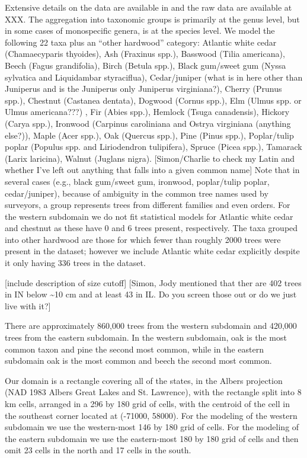 \documentclass[12pt]{article}\usepackage[]{graphicx}\usepackage[]{color}
\begin{document}
Extensive details on the data are available in \cite{Gori:etal:2015}
and the raw data are available at XXX. The aggregation into taxonomic
groups is primarily at the genus level, but in some cases of monospecific
genera, is at the species level. We model the following 22 taxa plus
an ``other hardwood'' category: Atlantic white cedar (Chamaecyparis
thyoides), Ash (Fraxinus spp.), Basswood (Tilia americana), Beech
(Fagus grandifolia), Birch (Betula spp.), Black gum/sweet gum (Nyssa
sylvatica and Liquidambar styraciflua), Cedar/juniper (what is in
here other than Juniperus and is the Juniperus only Juniperus virginiana?),
Cherry (Prunus spp.), Chestnut (Castanea dentata), Dogwood (Cornus
spp.), Elm (Ulmus spp. or Ulmus americana???) , Fir (Abies spp.),
Hemlock (Tsuga canadensis), Hickory (Carya spp.), Ironwood (Carpinus
caroliniana and Ostrya virginiana (anything else?)), Maple (Acer spp.),
Oak (Quercus spp.), Pine (Pinus spp.), Poplar/tulip poplar (Populus
spp. and Liriodendron tulipifera), Spruce (Picea spp.), Tamarack (Larix
laricina), Walnut (Juglans nigra). {[}Simon/Charlie to check my Latin
and whether I've left out anything that falls into a given common
name{]} Note that in several cases (e.g., black gum/sweet gum, ironwood,
poplar/tulip poplar, cedar/juniper), because of ambiguity in the common
tree names used by surveyors, a group represents trees from different
families and even orders. For the western subdomain we do not fit
statistical models for Atlantic white cedar and chestnut as these
have 0 and 6 trees present, respectively. The taxa grouped into other
hardwood are those for which fewer than roughly 2000 trees were present
in the dataset; however we include Atlantic white cedar explicitly
despite it only having 336 trees in the dataset.

{[}include description of size cutoff{]} {[}Simon, Jody mentioned
that ther are 402 trees in IN below \textasciitilde{}10 cm and at
least 43 in IL. Do you screen those out or do we just live with it?{]}

There are approximately 860,000 trees from the western subdomain and
420,000 trees from the eastern subdomain. In the western subdomain,
oak is the most common taxon and pine the second most common, while
in the eastern subdomain oak is the most common and beech the second
most common.

Our domain is a rectangle covering all of the states, in the Albers
projection (NAD 1983 Albers Great Lakes and St. Lawrence), with the
rectangle split into 8 km cells, arranged in a 296 by 180 grid of
cells, with the centroid of the cell in the southeast corner located
at (-71000, 58000). For the modeling of the western subdomain we use
the western-most 146 by 180 grid of cells. For the modeling of the
eastern subdomain we use the eastern-most 180 by 180 grid of cells
and then omit 23 cells in the north and 17 cells in the south.
\end{document}
